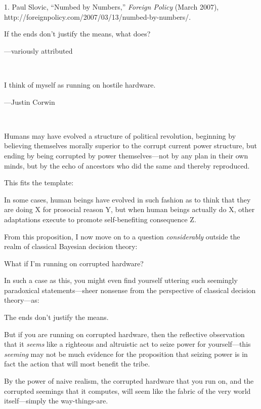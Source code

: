 \bigskip

{
 1. Paul Slovic, ``Numbed by
Numbers,'' \textit{Foreign Policy} (March 2007),
http://foreignpolicy.com/2007/03/13/numbed-by-numbers/.}


{
 If the ends don't justify the means, what does?}

{\raggedleft
 {}---variously attributed
\par}


\bigskip

{
 ~}

{
 I think of myself as running on hostile hardware.}

{\raggedleft
 {}---Justin Corwin
\par}


\bigskip

{
 ~}

{
 Humans may have evolved a structure of political revolution,
beginning by believing themselves morally superior to the corrupt
current power structure, but ending by being corrupted by power
themselves{}---not by any plan in their own minds, but by the echo of
ancestors who did the same and thereby reproduced.}

{
 This fits the template:}

{
 In some cases, human beings have evolved in such fashion as to
think that they are doing X for prosocial reason Y, but when human
beings actually do X, other adaptations execute to promote
self-benefiting consequence Z.}

{
 From this proposition, I now move on to a question
\textit{considerably} outside the realm of classical Bayesian decision
theory:}

{
 What if I'm running on corrupted hardware?}

{
 In such a case as this, you might even find yourself uttering such
seemingly paradoxical statements---sheer nonsense from the perspective
of classical decision theory---as:}

{
 The ends don't justify the means.}

{
 But if you are running on corrupted hardware, then the reflective
observation that it \textit{seems} like a righteous and altruistic act
to seize power for yourself---this \textit{seeming} may not be much
evidence for the proposition that seizing power is in fact the action
that will most benefit the tribe.}

{
 By the power of naive realism, the corrupted hardware that you run
on, and the corrupted seemings that it computes, will seem like the
fabric of the very world itself---simply the way-things-are.}

